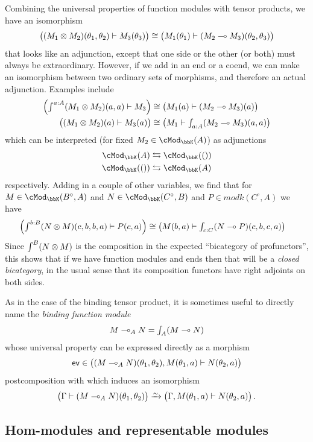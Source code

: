 \documentclass{amsart}
\newcommand{\K}{\bbK}
\let\mod\cMod
\def\modk{\mod_\K}
\renewcommand{\o}{^{\circ}}
\let\mto\vdash    %
\def\mhom#1#2{\left( #1 \vphantom{\big|}\mto #2 \right)}
\newcommand{\coend}{\begingroup\textstyle\int\endgroup}
\newcommand{\tend}{\begingroup\textstyle\int\endgroup}
\newcommand{\ev}{\mathsf{ev}}
\begin{document}
Combining the universal properties of function modules with tensor products, we have an isomorphism
\[ \mhom{(M_1\otimes M_2)(\theta_1,\theta_2)}{M_3(\theta_3)} \cong \mhom{M_1(\theta_1)}{(M_2\multimap M_3)(\theta_2,\theta_3)}
\]
that looks like an adjunction, except that one side or the other (or both) must always be extraordinary.
However, if we add in an end or a coend, we can make an isomorphism between two ordinary sets of morphisms, and therefore an actual adjunction.
Examples include
\begin{align*}
  \mhom{\coend^{a:A} (M_1\otimes M_2)(a,a)}{M_3} &\cong \mhom{M_1(a)}{(M_2\multimap M_3)(a)}\\
  \mhom{(M_1\otimes M_2)(a)}{M_3(a)} &\cong \mhom{M_1}{\tend_{a:A} (M_2\multimap M_3)(a,a)}\\
\end{align*}
which can be interpreted (for fixed $M_2\in \modk(A)$) as adjunctions
\begin{align*}
  \modk(A) &\leftrightarrows \modk(())\\
  \modk(()) &\leftrightarrows \modk(A)
\end{align*}
respectively.
Adding in a couple of other variables, we find that for $M\in \modk(B\o,A)$ and $N\in\modk(C\o,B)$ and $P\in modk(C\o,A)$ we have
\begin{align*}
  \mhom{\coend^{b:B} (N\otimes M)(c,b,b,a)}{P(c,a)} &\cong \mhom{M(b,a)}{\tend_{c:C} (N\multimap P)(c,b,c,a)}
\end{align*}
Since $\coend^B (N\otimes M)$ is the composition in the expected ``bicategory of profunctors'', this shows that if we have function modules and ends then that will be a \emph{closed bicategory}, in the usual sense that its composition functors have right adjoints on both sides.

As in the case of the binding tensor product, it is sometimes useful to directly name the \emph{binding function module}
\[ M\multimap_A N = \tend_A (M\multimap N)\]
whose universal property can be expressed directly as a morphism
\[\ev\in \mhom{(M\multimap_A N)(\theta_1,\theta_2),M(\theta_1,a)}{N(\theta_2,a)}\]
postcomposition with which induces an isomorphism
\[ \mhom{\Gamma}{(M\multimap_A N)(\theta_1,\theta_2)} \toiso
\mhom{\Gamma,M(\theta_1,a)}{N(\theta_2,a)}.
\]


\subsection{Hom-modules and representable modules}
\label{sec:hom}
\end{document}
